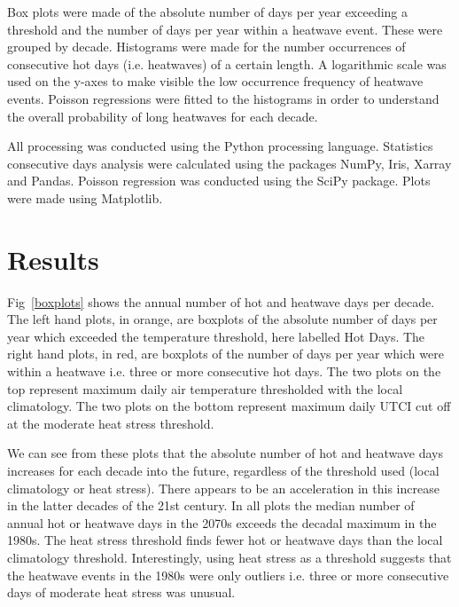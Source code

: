 \documentclass[10pt,letterpaper]{article}
\begin{document}
Box plots were made of the absolute number of days per year exceeding a threshold and the number of days per year within a heatwave event. 
These were grouped by decade.
Histograms were made for the number occurrences of consecutive hot days (i.e. heatwaves) of a certain length.
A logarithmic scale was used on the y-axes to make visible the low occurrence frequency of heatwave events.
Poisson regressions were fitted to the histograms in order to understand the overall probability of long heatwaves for each decade.


All processing was conducted using the Python processing language.
Statistics consecutive days analysis were calculated using the packages NumPy, Iris, Xarray and Pandas.
Poisson regression was conducted using the SciPy package.
Plots were made using Matplotlib.











\section*{Results}

Fig~\ref{boxplots} shows the annual number of hot and heatwave days per decade.
The left hand plots, in orange, are boxplots of the absolute number of days per year which exceeded the temperature threshold, here labelled Hot Days. 
The right hand plots, in red, are boxplots of the number of days per year which were within a heatwave i.e. three or more consecutive hot days.
The two plots on the top represent maximum daily air temperature thresholded with the local climatology.
The two plots on the bottom represent maximum daily UTCI cut off at the moderate heat stress threshold.

We can see from these plots that the absolute number of hot and heatwave days increases for each decade into the future, regardless of the threshold used (local climatology or heat stress).
There appears to be an acceleration in this increase in the latter decades of the 21st century.
In all plots the median number of annual hot or heatwave days in the 2070s exceeds the decadal maximum in the 1980s.
The heat stress threshold finds fewer hot or heatwave days than the local climatology threshold.
Interestingly, using heat stress as a threshold suggests that the heatwave events in the 1980s were only outliers i.e. three or more consecutive days of moderate heat stress was unusual.
\end{document}
